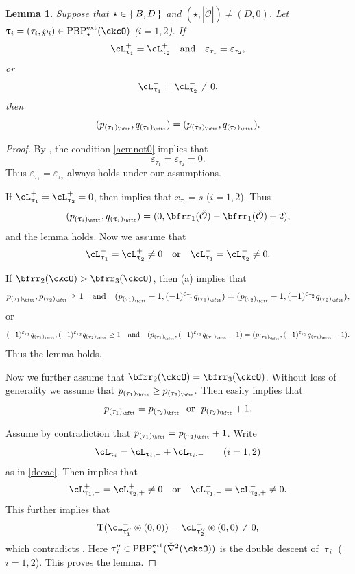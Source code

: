 \documentclass[11pt,a4paper]{amsart}
\def\abs#1{\left|{#1}\right|}
\newcommand{\CO}{{\mathcal {O}}}
\def\DD{\nabla}
\newcommand{\be}{\begin {equation}}
\newcommand{\ee}{\end {equation}}
\numberwithin{equation}{section}
\newtheorem{lem}[thm]{Lemma}
\theoremstyle{remark}
\def\PBPe{\mathrm{PBP}^{\mathrm{ext}}}
\def\PBPes{\mathrm{PBP}^{\mathrm{ext}}_{\star}}
\def\ckDD{{\check\DD}}
\def\maltese{\mathrm{T}}
\def\pac#1{\ac_{#1}^+}
\def\nac#1{\ac_{#1}^-}
\def\ac{\cL}
\begin{document}
\begin{lem}\label{lem:signbd}
Suppose that $\star \in \set{B,D}$ and $(\star, \abs{\check \CO})\neq (D, 0)$.
Let $\uptau_i=(\tau_i, \wp_i)\in \PBPe_\star(\ckcO)$ ($i=1,2$). If
  \[
    \ac_{\uptau_1}^+= \ac_{\uptau_2}^+\quad \textrm{and}\quad \varepsilon_{\tau_1}=\varepsilon_{\tau_2},
  \]
  or
  \be\label{acmnot0}
  \ac_{\uptau_1}^-= \ac_{\uptau_2}^-\neq 0,
  \ee
  then
  \[
      (p_{(\tau_1)_\bftt}, q_{(\tau_1)_\bftt}) =(p_{(\tau_2)_\bftt}, q_{(\tau_2)_\bftt}).
  \]
\end{lem}
\begin{proof}
By , the  condition \eqref{acmnot0}  implies that
\[
\varepsilon_{\tau_1}=\varepsilon_{\tau_2}=0.
\]
Thus $\varepsilon_{\tau_1}=\varepsilon_{\tau_2}$ always holds under our assumptions.

If $\ac_{\uptau_1}^+= \ac_{\uptau_2}^+=0$, then  implies that $x_{\tau_i}=s$ ($i=1,2$). Thus
\[
      (p_{(\uptau_i)_\bftt}, q_{(\uptau_i)_\bftt}) =(0,  \bfrr_1(\check \CO)-\bfrr_1(\check \CO) +2),
  \]
  and the lemma holds.
  Now we assume that
 \[  \ac_{\uptau_1}^+= \ac_{\uptau_2}^+\neq 0\quad \textrm{or}\quad \ac_{\uptau_1}^-= \ac_{\uptau_2}^-\neq 0.
 \]

 If $\bfrr_2(\ckcO)>\bfrr_3(\ckcO)$, then  (a) implies that
 \[
  p_{(\tau_1)_\bftt},  p_{(\tau_2)_\bftt}\geq 1\quad \textrm{and}\quad
  (p_{{(\tau_1)}_{\bftt}}-1, (-1)^{\varepsilon_{\tau_1}}q_{(\tau_1)_{\bftt}})=
   (p_{{(\tau_2)}_{\bftt}}-1, (-1)^{\varepsilon_{\tau_2}}q_{(\tau_2)_{\bftt}}),
\]
or
\[
  (-1)^{\varepsilon_{\tau_1}}q_{(\tau_1)_{\bftt}},  (-1)^{\varepsilon_{\tau_2}}q_{(\tau_2)_{\bftt}}\geq 1\quad \textrm{and}\quad
  (p_{{(\tau_1)}_{\bftt}}, (-1)^{\varepsilon_{\tau_1}}q_{(\tau_1)_{\bftt}}-1)=
   (p_{{(\tau_2)}_{\bftt}}, (-1)^{\varepsilon_{\tau_2}}q_{(\tau_2)_{\bftt}}-1).
\]
Thus the lemma holds.


Now we further assume that $\bfrr_2(\ckcO)=\bfrr_3(\ckcO)$. Without loss of generality we assume that
$
  p_{(\tau_1)_{\bftt}}\geq p_{(\tau_2)_{\bftt}}.
$
Then   easily implies that
\[
   p_{(\tau_1)_{\bftt}}= p_{(\tau_2)_{\bftt}}\ \textrm{ or }\ p_{(\tau_2)_{\bftt}}+1.
\]


Assume by contradiction that $p_{(\tau_1)_{\bftt}}= p_{(\tau_2)_{\bftt}}+1$.
Write
\[
  \ac_{\uptau_i}=\ac_{\uptau_i, +}+\ac_{\uptau_i,-}\qquad (i=1,2)
\]
as in \eqref{decac}.
Then    implies that
\[
  \ac_{\uptau_1, -}^+=\ac_{\uptau_2, +}^+\neq 0\quad \textrm{or}\quad \ac_{\uptau_1, -}^-=\ac_{\uptau_2, +}^-\neq 0.
\]
This further implies that
\[
\maltese(\nac{\uptau_1''}\circledast (0,0) ) =
    \pac{\uptau_2''}\circledast (0,0) \neq 0,
    \]
    which contradicts . Here $\uptau_i''\in \PBPes{(\ckDD^2(\ckcO))}$ is the double descent of $\uptau_i$ ($i=1,2$). This proves the lemma.
\end{proof}
\end{document}
